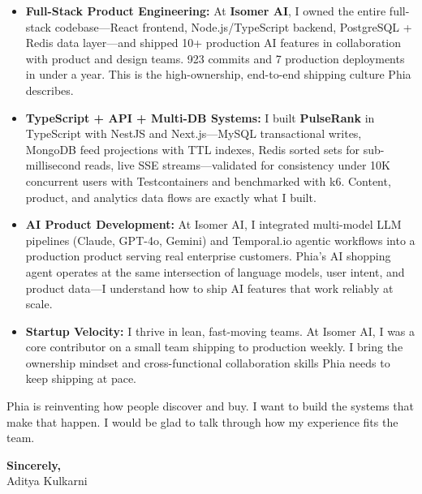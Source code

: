 \documentclass[11pt,letterpaper]{article}
\begin{document}
\begin{itemize}[leftmargin=*, itemsep=3pt, label={\color{PhiaPurple}\faAngleRight}]
    \item \textbf{Full-Stack Product Engineering:} At \textbf{Isomer AI}, I owned the entire full-stack codebase---React frontend, Node.js/TypeScript backend, PostgreSQL + Redis data layer---and shipped 10+ production AI features in collaboration with product and design teams. 923 commits and 7 production deployments in under a year. This is the high-ownership, end-to-end shipping culture Phia describes.

    \item \textbf{TypeScript + API + Multi-DB Systems:} I built \textbf{PulseRank} in TypeScript with NestJS and Next.js---MySQL transactional writes, MongoDB feed projections with TTL indexes, Redis sorted sets for sub-millisecond reads, live SSE streams---validated for consistency under 10K concurrent users with Testcontainers and benchmarked with k6. Content, product, and analytics data flows are exactly what I built.

    \item \textbf{AI Product Development:} At Isomer AI, I integrated multi-model LLM pipelines (Claude, GPT-4o, Gemini) and Temporal.io agentic workflows into a production product serving real enterprise customers. Phia's AI shopping agent operates at the same intersection of language models, user intent, and product data---I understand how to ship AI features that work reliably at scale.

    \item \textbf{Startup Velocity:} I thrive in lean, fast-moving teams. At Isomer AI, I was a core contributor on a small team shipping to production weekly. I bring the ownership mindset and cross-functional collaboration skills Phia needs to keep shipping at pace.
\end{itemize}

\vspace{6pt}

Phia is reinventing how people discover and buy. I want to build the systems that make that happen. I would be glad to talk through how my experience fits the team.

\vspace{12pt}

\textbf{Sincerely,}\\[8pt]
Aditya Kulkarni
\end{document}
